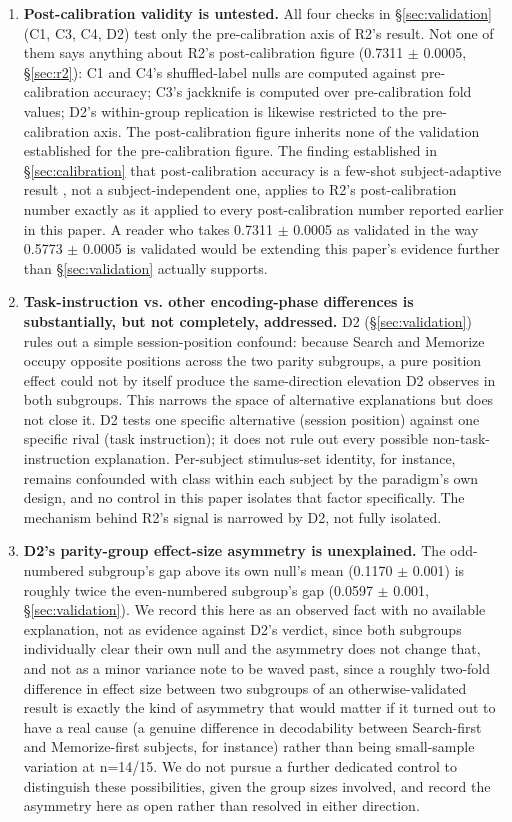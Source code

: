 \documentclass[preprint,12pt]{elsarticle}
\begin{document}
\begin{enumerate}
\item \textbf{Post-calibration validity is untested.} All four checks in \S\ref{sec:validation} (C1, C3, C4, D2) test only the pre-calibration axis of R2's result. Not one of them says anything about R2's post-calibration figure (0.7311 $\pm$ 0.0005, \S\ref{sec:r2}): C1 and C4's shuffled-label nulls are computed against pre-calibration accuracy; C3's jackknife is computed over pre-calibration fold values; D2's within-group replication is likewise restricted to the pre-calibration axis. The post-calibration figure inherits none of the validation established for the pre-calibration figure. The finding established in \S\ref{sec:calibration} that post-calibration accuracy is a few-shot subject-adaptive result \cite{he2020,jayaram2016}, not a subject-independent one, applies to R2's post-calibration number exactly as it applied to every post-calibration number reported earlier in this paper. A reader who takes 0.7311 $\pm$ 0.0005 as validated in the way 0.5773 $\pm$ 0.0005 is validated would be extending this paper's evidence further than \S\ref{sec:validation} actually supports.
\item \textbf{Task-instruction vs. other encoding-phase differences is substantially, but not completely, addressed.} D2 (\S\ref{sec:validation}) rules out a simple session-position confound: because Search and Memorize occupy opposite positions across the two parity subgroups, a pure position effect could not by itself produce the same-direction elevation D2 observes in both subgroups. This narrows the space of alternative explanations but does not close it. D2 tests one specific alternative (session position) against one specific rival (task instruction); it does not rule out every possible non-task-instruction explanation. Per-subject stimulus-set identity, for instance, remains confounded with class within each subject by the paradigm's own design, and no control in this paper isolates that factor specifically. The mechanism behind R2's signal is narrowed by D2, not fully isolated.
\item \textbf{D2's parity-group effect-size asymmetry is unexplained.} The odd-numbered subgroup's gap above its own null's mean (0.1170 $\pm$ 0.001) is roughly twice the even-numbered subgroup's gap (0.0597 $\pm$ 0.001, \S\ref{sec:validation}). We record this here as an observed fact with no available explanation, not as evidence against D2's verdict, since both subgroups individually clear their own null and the asymmetry does not change that, and not as a minor variance note to be waved past, since a roughly two-fold difference in effect size between two subgroups of an otherwise-validated result is exactly the kind of asymmetry that would matter if it turned out to have a real cause (a genuine difference in decodability between Search-first and Memorize-first subjects, for instance) rather than being small-sample variation at n=14/15. We do not pursue a further dedicated control to distinguish these possibilities, given the group sizes involved, and record the asymmetry here as open rather than resolved in either direction.

\end{enumerate}
\end{document}
